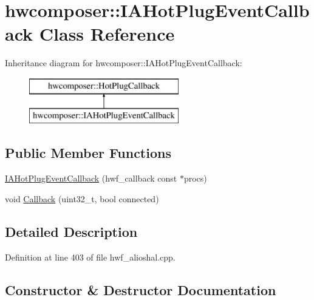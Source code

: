 \hypertarget{classhwcomposer_1_1IAHotPlugEventCallback}{}\section{hwcomposer\+:\+:I\+A\+Hot\+Plug\+Event\+Callback Class Reference}
\label{classhwcomposer_1_1IAHotPlugEventCallback}
Inheritance diagram for hwcomposer\+:\+:I\+A\+Hot\+Plug\+Event\+Callback\+:\begin{figure}[H]
\begin{center}
\leavevmode
\includegraphics[height=2.000000cm]{classhwcomposer_1_1IAHotPlugEventCallback}
\end{center}
\end{figure}
\subsection*{Public Member Functions}
\begin{DoxyCompactItemize}
\item 
\mbox{\hyperlink{classhwcomposer_1_1IAHotPlugEventCallback_a1d6052a2e63656b115589f9daeca04c4}{I\+A\+Hot\+Plug\+Event\+Callback}} (hwf\+\_\+callback const $\ast$procs)
\item 
void \mbox{\hyperlink{classhwcomposer_1_1IAHotPlugEventCallback_a77b86b9fb88073abf1cab0b5aed4be1d}{Callback}} (uint32\+\_\+t, bool connected)
\end{DoxyCompactItemize}


\subsection{Detailed Description}


Definition at line 403 of file hwf\+\_\+alioshal.\+cpp.



\subsection{Constructor \& Destructor Documentation}
\mbox{\label{classhwcomposer_1_1IAHotPlugEventCallback_a1d6052a2e63656b115589f9daeca04c4}} 
